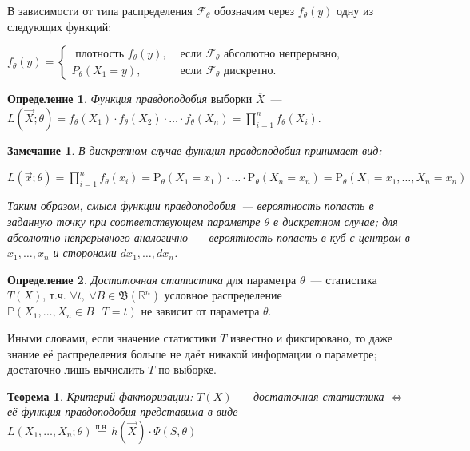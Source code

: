 \documentclass[oneside,final,14pt]{extreport}
\newtheorem{thm}{Теорема}[section]
\newtheorem*{rmrk}{Замечание}
\theoremstyle{definition}
\newtheorem{defn}{Определение}[section]
\begin{document}
В зависимости от типа распределения \( \mathcal{F}_\theta \) обозначим через \( f_{\theta}(y) \) одну из следующих функций:

\( f_{\theta}(y)=\left\{\begin{array}{ll}
\text { плотность } f_{\theta}(y), & \text { если } \mathcal{F}_{\theta} \text { абсолютно непрерывно, } \\
P_{\theta}\left(X_{1}=y\right), & \text { если } \mathcal{F}_{\theta} \text { дискретно. }
\end{array}\right. \)

\begin{defn}
{\it Функция правдоподобия} выборки \(\overline{X}\)~--- \( L(\vec{X} ; \theta)=f_{\theta}\left(X_{1}\right) \cdot f_{\theta}\left(X_{2}\right) \cdot \ldots \cdot f_{\theta}\left(X_{n}\right)=\prod_{i=1}^{n} f_{\theta}\left(X_{i}\right) \).
\end{defn}

\begin{rmrk}
В дискретном случае функция правдоподобия принимает вид:

\( 
L(\vec{x} ; \theta)=\prod_{i=1}^{n} f_{\theta}(x_{i}) =\mathrm{P}_{\theta}(X_{1}=x_{1}) \cdot \ldots \cdot \mathrm{P}_{\theta}(X_{n}=x_{n}) = \mathrm{P}_{\theta}(X_{1}=x_{1}, \ldots, X_{n}=x_{n})
\)

Таким образом, смысл функции правдоподобия~--- вероятность попасть в заданную точку при соответствующем параметре \( \theta \) в дискретном случае; для абсолютно непрерывного аналогично~--- вероятность попасть в куб с центром в \(x_1, \ldots, x_n\) и сторонами \(dx_1, \ldots, dx_n \).
\end{rmrk}

\begin{defn}
{\it Достаточная статистика} для параметра \( \theta \)~--- статистика \( T(X) \), т.ч. \( \forall t,~ \forall B \in \mathfrak{B}(\mathbb{R}^{n})\) условное распределение \( \mathbb{P}(X_1, \ldots, X_n \in B~|~T=t) \) не зависит от параметра \( \theta \).
\end{defn}

Иными словами, если значение статистики \( T \) известно и фиксировано, то даже знание её распределения больше не даёт никакой информации о параметре; достаточно лишь вычислить \( T \) по выборке.

\begin{thm}
{\it Критерий факторизации:} \( T(X) \)~--- достаточная статистика \(\Leftrightarrow \) её функция правдоподобия представима в виде \( L(X_{1}, \ldots, X_{n} ; \theta) \stackrel{\text{п.н.}}{=} h(\vec{X}) \cdot \Psi(S, \theta)\)
\end{thm}
\end{document}

